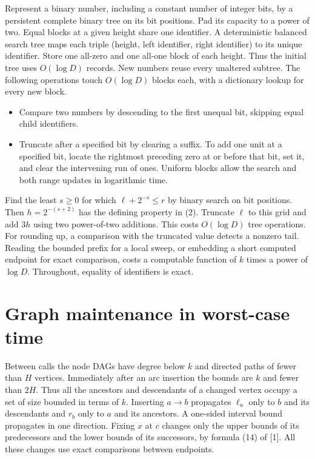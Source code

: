 \documentclass[11pt,a4paper]{article}
\begin{document}
Represent a binary number, including a constant number of integer bits, by a
persistent complete binary tree on its bit positions. Pad its capacity to a
power of two. Equal blocks at a given height share one identifier. A
deterministic balanced search tree maps each triple (height, left identifier,
right identifier) to its unique identifier. Store one all-zero and one all-one
block of each height. Thus the initial tree uses $O(\log D)$ records. New
numbers reuse every unaltered subtree. The following operations touch
$O(\log D)$ blocks each, with a dictionary lookup for every new block.
\begin{itemize}
\item Compare two numbers by descending to the first unequal bit, skipping
equal child identifiers.
\item Truncate after a specified bit by clearing a suffix. To add one unit at
a specified bit, locate the rightmost preceding zero at or before that bit,
set it, and clear the intervening run of ones. Uniform blocks allow the search
and both range updates in logarithmic time.
\end{itemize}
Find the least $s\ge0$ for which $\ell+2^{-s}\le r$ by binary search on bit
positions. Then $h=2^{-(s+2)}$ has the defining property in (2). Truncate $\ell$
to this grid and add $3h$ using two power-of-two additions. This costs
$O(\log D)$ tree operations. For rounding up, a comparison with the truncated
value detects a nonzero tail. Reading the bounded prefix for a local sweep,
or embedding a short computed endpoint for exact comparison, costs a computable
function of $k$ times a power of $\log D$. Throughout, equality of identifiers
is exact.

\section{Graph maintenance in worst-case time}
Between calls the node DAGs have degree below $k$ and directed paths of fewer
than $H$ vertices. Immediately after an arc insertion the bounds are $k$ and
fewer than $2H$. Thus all the ancestors and descendants of a changed vertex
occupy a set of size bounded in terms of $k$. Inserting $a\to b$ propagates
$\ell_a$ only to $b$ and its descendants and $r_b$ only to $a$ and its ancestors.
A one-sided interval bound propagates in one direction. Fixing $x$ at $c$
changes only the upper bounds of its predecessors and the lower bounds of its
successors, by formula (14) of [1]. All these changes use exact comparisons
between endpoints.
\end{document}
